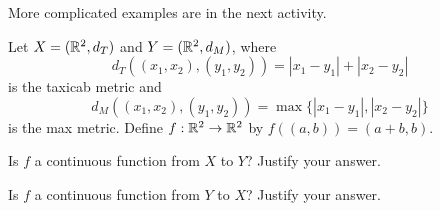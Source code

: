 \begin{comment}

\ActivitySolution
	\ba
	\item Let $a \in X$ and let $\epsilon$ be greater than 0. Choose $\delta$ to be any positive number. If $d_X(x,a) < \delta$, then $d_Y(f(x),f(a)) = d_Y(b,b) = 0 < \epsilon$.  Therefore, $f$ is continuous at every point in $X$ and so is a continuous function. 
		
	\item Let $a \in X$ and let $\epsilon$ be greater than 0. Choose $\delta = \epsilon$. If $d_X(x,a) < \delta$, then $d_X(f(x),f(a)) = d_X(x,a) < \delta = \epsilon$.  Therefore, $f$ is continuous at every point in $X$ and so is a continuous function. 
	
	\item In Example \ref{exp:not_continuous} the domain and codomain are different metric spaces, which is not the case in (b).	
	\ea

\end{comment}

More complicated examples are in the next activity.

\begin{activity} Let $X = (\mathbb{R}^2, d_T)$ and $Y = (\mathbb{R}^2, d_M)$, where 
\[d_T((x_1, x_2), (y_1,y_2)) = | x_1-y_1 | + | x_2-y_2 |\]
is the taxicab metric and 
\[d_M((x_1, x_2), (y_1,y_2)) = \max\{| x_1-y_1 |,  | x_2-y_2 |\}\]
is the max metric. Define $f : \mathbb{R}^2 \to \mathbb{R}^2$ by $f((a,b)) = (a+b, b)$.
	\ba
	\item Is $f$ a continuous function from $X$ to $Y$? Justify your answer.
	
	\item Is $f$ a continuous function from $Y$ to $X$? Justify your answer.
	
	
	\ea
\end{activity}


